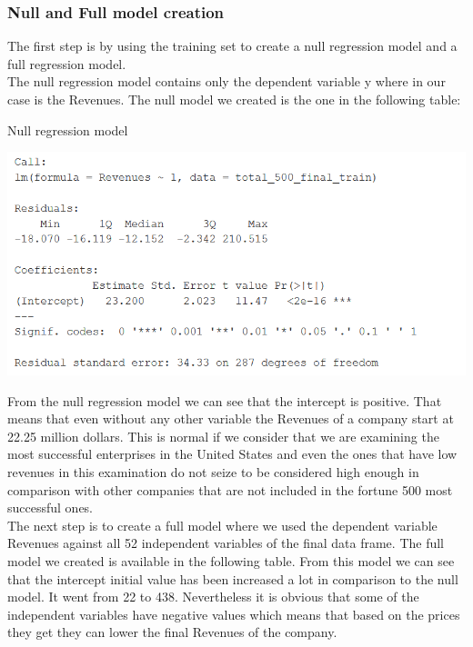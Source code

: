 \documentclass{book}
\begin{document}
\subsubsection{Null and Full model creation}
The first step is by using the training set to create a null regression model and a full regression model.\\
The null regression model contains only the dependent variable y where in our case is the Revenues. The null model we created is the one in the following table:
\begin{table}[H]
\centering
\caption{Null regression model}
\begin{center}
\includegraphics[scale=0.8]{../R/photos/65_null_model.PNG}   \\
\end{center}
\end{table}
From the null regression model we can see that the intercept is positive. That means that even without any other variable the Revenues of a company start at 22.25 million dollars. This is normal if we consider that we are examining the most successful enterprises in the United States and even the ones that have low revenues in this examination do not seize to be considered high enough in comparison with other companies that are not included in the fortune 500 most successful ones.\\
The next step is to create a full model where we used the dependent variable Revenues against all 52 independent variables of the final data frame. The full model we created is available in the following table. From this model we can see that the intercept initial value has been increased a lot in comparison to the null model. It went from 22 to 438. Nevertheless it is obvious that some of the independent variables have negative values which means that based on the prices they get they can lower the final Revenues of the company.\\
\end{document}
